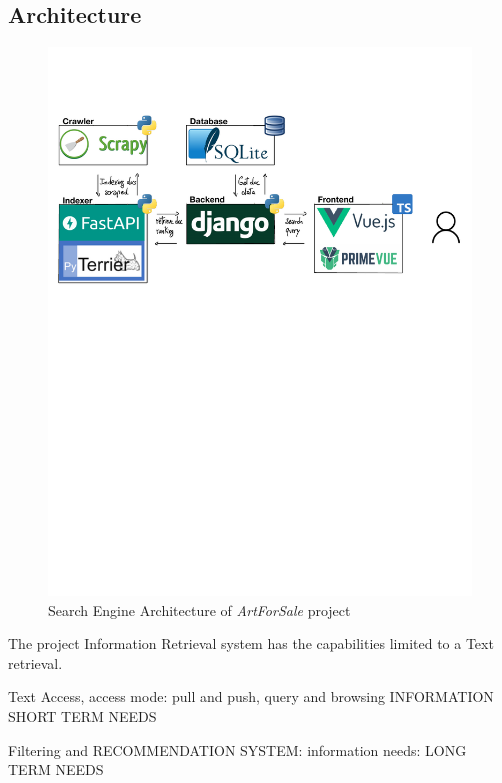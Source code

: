 \documentclass[12pt]{spieman}  %
\begin{document}
\begin{spacing}{1}
    \section{Architecture}\label{sec:architecture}

    \begin{figure}[H]
        \centering
        \caption{Search Engine Architecture of \textit{ArtForSale} project}
        \label{fig:architecture}
        \includegraphics[width=\textwidth, trim={0cm 16cm 0cm  3cm}]{figures/architecture.pdf}
    \end{figure}

    The project Information Retrieval system has the capabilities limited to a Text retrieval.

    Text Access, access mode: pull and push, query and browsing
    INFORMATION SHORT TERM NEEDS

    Filtering and RECOMMENDATION SYSTEM: information needs: LONG TERM NEEDS


\end{spacing}
\end{document}

